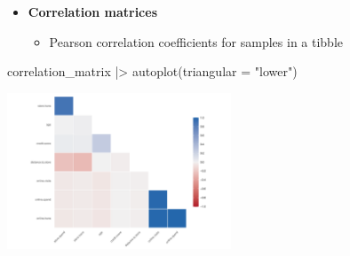 \documentclass[
  ignorenonframetext,
]{beamer}
\newenvironment{Shaded}{\begin{snugshade}}{\end{snugshade}}
\newcommand{\AttributeTok}[1]{\textcolor[rgb]{0.40,0.45,0.13}{#1}}
\newcommand{\FunctionTok}[1]{\textcolor[rgb]{0.28,0.35,0.67}{#1}}
\newcommand{\NormalTok}[1]{\textcolor[rgb]{0.00,0.23,0.31}{#1}}
\newcommand{\SpecialCharTok}[1]{\textcolor[rgb]{0.37,0.37,0.37}{#1}}
\newcommand{\StringTok}[1]{\textcolor[rgb]{0.13,0.47,0.30}{#1}}
\providecommand{\tightlist}{%
  \setlength{\itemsep}{0pt}\setlength{\parskip}{0pt}}\usepackage{longtable,booktabs,array}
\begin{document}
\begin{frame}[fragile]{}
\label{section-20}
\begin{itemize}
\item
  \textbf{Correlation matrices}

  \begin{itemize}
  \tightlist
  \item
    Pearson correlation coefficients for samples in a tibble
  \end{itemize}
\end{itemize}

\tiny

\begin{Shaded}
\begin{Highlighting}[]
\NormalTok{correlation\_matrix }\SpecialCharTok{|\textgreater{}} \FunctionTok{autoplot}\NormalTok{(}\AttributeTok{triangular =} \StringTok{"lower"}\NormalTok{)}
\end{Highlighting}
\end{Shaded}

\begin{center}
\includegraphics[width=0.5\textwidth,height=\textheight]{004_relationships_between_continuous_variables_files/figure-beamer/unnamed-chunk-18-1.pdf}
\end{center}
\end{frame}
\end{document}

